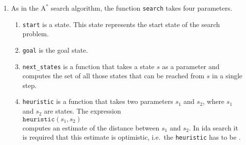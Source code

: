 \begin{enumerate}
\item As in the $\mathrm{A}^*$ search algorithm, the function \texttt{search} takes four parameters.
      \begin{enumerate}
      \item \texttt{start} is a state.  This state represents the start state of the search problem.
      \item \texttt{goal} is the goal state.
      \item \texttt{next\_states} is a function that takes a state $s$ as a parameter and
            computes the set of all those states that can be reached from $s$ in a single step.
      \item \texttt{heuristic} is a function that takes two parameters $s_1$ and $s_2$, where $s_1$ and $s_2$
            are states. The expression
            \\[0.2cm]
            \hspace*{1.3cm}
            $\texttt{heuristic}(s_1, s_2)$
            \\[0.2cm]
            computes an estimate of the distance between $s_1$ and $s_2$.  In \ac{ida} search it is required that this
            estimate is optimistic, i.e.~the \texttt{heuristic} has to be .


\end{enumerate}
\end{enumerate}
